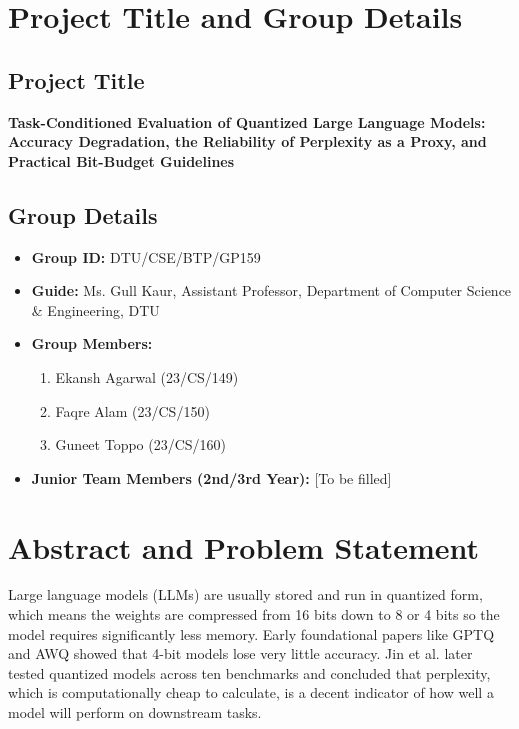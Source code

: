 \documentclass[12pt, a4paper]{article}
\begin{document}
\newpage
\tableofcontents
\newpage

\section{Project Title and Group Details}

\subsection{Project Title}
\textbf{Task-Conditioned Evaluation of Quantized Large Language Models: Accuracy Degradation, the Reliability of Perplexity as a Proxy, and Practical Bit-Budget Guidelines}

\subsection{Group Details}
\begin{itemize}[leftmargin=*]
    \item \textbf{Group ID:} DTU/CSE/BTP/GP159
    \item \textbf{Guide:} Ms. Gull Kaur, Assistant Professor, Department of Computer Science \& Engineering, DTU
    \item \textbf{Group Members:}
    \begin{enumerate}
        \item Ekansh Agarwal (23/CS/149)
        \item Faqre Alam (23/CS/150)
        \item Guneet Toppo (23/CS/160)
    \end{enumerate}
    \item \textbf{Junior Team Members (2nd/3rd Year):} [To be filled]
\end{itemize}

\section{Abstract and Problem Statement}

Large language models (LLMs) are usually stored and run in quantized form, which means the weights are compressed from 16 bits down to 8 or 4 bits so the model requires significantly less memory. Early foundational papers like GPTQ and AWQ showed that 4-bit models lose very little accuracy. Jin et al. later tested quantized models across ten benchmarks and concluded that perplexity, which is computationally cheap to calculate, is a decent indicator of how well a model will perform on downstream tasks.
\end{document}
